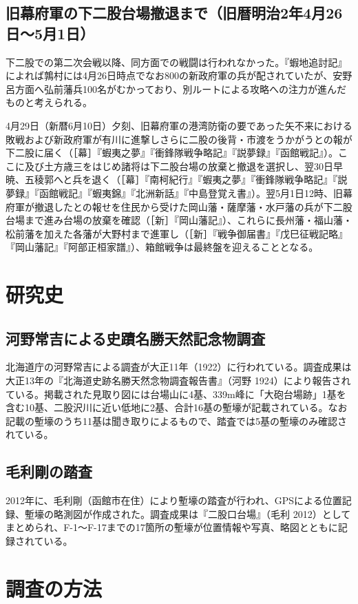 \documentclass[11pt,report]{jsarticle}
\begin{document}
\subsection{旧幕府軍の下二股台場撤退まで（旧暦明治2年4月26日～5月1日）}
下二股での第二次会戦以降、同方面での戦闘は行われなかった。『蝦地追討記』によれば鶉村には4月26日時点でなお800の新政府軍の兵が配されていたが、安野呂方面へ弘前藩兵100名がむかっており、別ルートによる攻略への注力が進んだものと考えられる。

4月29日（新暦6月10日）夕刻、旧幕府軍の港湾防衛の要であった矢不来における敗戦および新政府軍が有川に進撃しさらに二股の後背・市渡をうかがうとの報が下二股に届く（［幕］『蝦夷之夢』『衝鋒隊戦争略記』『説夢録』『函館戦記』）。ここに及び土方歳三をはじめ諸将は下二股台場の放棄と撤退を選択し、翌30日早暁、五稜郭へと兵を退く（［幕］『南柯紀行』『蝦夷之夢』『衝鋒隊戦争略記』『説夢録』『函館戦記』『蝦夷錦』『北洲新話』『中島登覚え書』）。翌5月1日12時、旧幕府軍が撤退したとの報せを住民から受けた岡山藩・薩摩藩・水戸藩の兵が下二股台場まで進み台場の放棄を確認（［新］『岡山藩記』）、これらに長州藩・福山藩・松前藩を加えた各藩が大野村まで進軍し（［新］『戦争御届書』『戊巳征戦記略』『岡山藩記』『阿部正桓家譜』）、箱館戦争は最終盤を迎えることとなる。

\section{研究史}
\subsection{河野常吉による史蹟名勝天然記念物調査}
北海道庁の河野常吉による調査が大正11年（1922）に行われている。調査成果は大正13年の『北海道史跡名勝天然念物調査報告書』（河野 1924）により報告されている。掲載された見取り図には台場山に4基、339m峰に「大砲台場跡」1基を含む10基、二股沢川に近い低地に2基、合計16基の塹壕が記載されている。なお記載の塹壕のうち11基は聞き取りによるもので、踏査では5基の塹壕のみ確認されている。

\subsection{毛利剛の踏査}
2012年に、毛利剛（函館市在住）により塹壕の踏査が行われ、GPSによる位置記録、塹壕の略測図が作成された。調査成果は『二股口台場』（毛利 2012）としてまとめられ、F-1〜F-17までの17箇所の塹壕が位置情報や写真、略図とともに記録されている。

\section{調査の方法}
\end{document}
